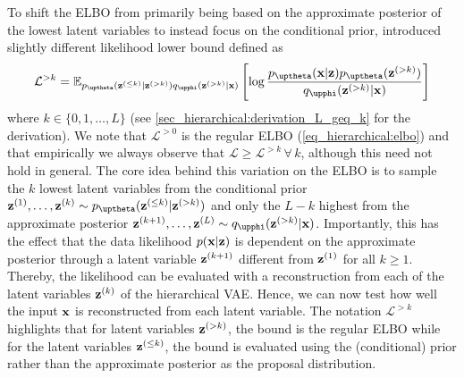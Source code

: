 {To shift the ELBO from primarily being based on the approximate posterior of the lowest latent variables to instead focus on the conditional prior, \textcite{maaloe_biva_2019} introduced slightly different likelihood lower bound defined as
\begin{equation}\label{eq_hierarchical:biva->k}
    \mathcal{L}^{>k} = \mathbb{E}_{p_\thetab(\zb^{(\leq k)}|\zb^{(>k)}) q_\phib(\zb^{(>k)}|\xb)} \left[ \log \frac{p_\thetab(\xb|\zb)p_\thetab(\zb^{(>k)})}{q_\phib(\zb^{(>k)}|\xb)} \right]
\end{equation}
where $k\in\{0,1,\dots,L\}$ (see \cref{sec_hierarchical:derivation_L_geq_k} for the derivation).
We note that $\mathcal{L}^{>0}$ is the regular ELBO (\cref{eq_hierarchical:elbo}) and that empirically we always observe that $\mathcal{L}\geq\mathcal{L}^{>k} \, \forall \, k$, although this need not hold in general.
The core idea behind this variation on the ELBO is to sample the $k$ lowest latent variables from the conditional prior $\zb^{(1)},\dots,\zb^{(k)} \sim p_\thetab(\zb^{(\leq k)}|\zb^{(>k)})$ and only the $L-k$ highest from the approximate posterior $\zb^{(k+1)},\dots,\zb^{(L)} \sim q_\phib(\zb^{(>k)}|\xb)$.
Importantly, this has the effect that the data likelihood $p({\mathbf{x}}|{\mathbf{z}})$ is dependent on the approximate posterior through a latent variable ${\mathbf{z}}^{(k+1)}$ different from ${\mathbf{z}}^{(1)}$ for all $k \geq 1$.
Thereby, the likelihood can be evaluated with a reconstruction from each of the latent variables ${\mathbf{z}}^{(k)}$ of the hierarchical VAE.
Hence, we can now test how well the input ${\mathbf{x}}$ is reconstructed from each latent variable.
The notation $\mathcal{L}^{>k}$ highlights that for latent variables ${\mathbf{z}}^{(>k)}$, the bound is the regular ELBO while for the latent variables ${\mathbf{z}}^{(\leq k)}$, the bound is evaluated using the (conditional) prior rather than the approximate posterior as the proposal distribution.


}
